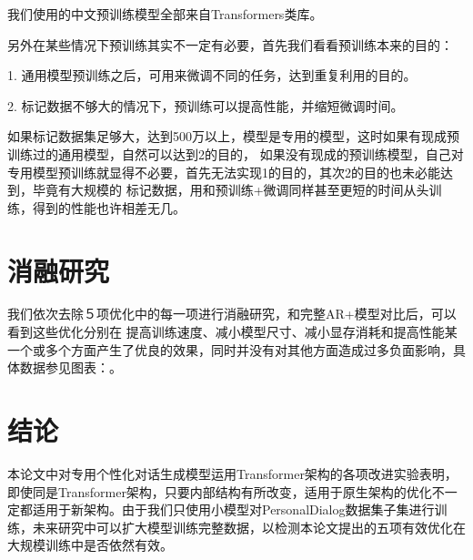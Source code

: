 \documentclass[letterpaper]{article} %
\DeclareRobustCommand{\citeext}[1]{\cite[#1]{#1}}
\begin{document}
\begin{CJK*}{UTF8}{gbsn}
我们使用的中文预训练模型全部来自Transformers类库\citeext{Wolf2019HuggingFacesTS}。

另外在某些情况下预训练其实不一定有必要，首先我们看看预训练本来的目的：

1. 通用模型预训练之后，可用来微调不同的任务，达到重复利用的目的。

2. 标记数据不够大的情况下，预训练可以提高性能，并缩短微调时间。

如果标记数据集足够大，达到500万以上，模型是专用的模型，这时如果有现成预训练过的通用模型，自然可以达到2的目的，
如果没有现成的预训练模型，自己对专用模型预训练就显得不必要，首先无法实现1的目的，其次2的目的也未必能达到，毕竟有大规模的
标记数据，用和预训练+微调同样甚至更短的时间从头训练，得到的性能也许相差无几。


\section[Ablation Study]{消融研究} 
我们依次去除５项优化中的每一项进行消融研究，和完整AR+模型对比后，可以看到这些优化分别在%
提高训练速度、减小模型尺寸、减小显存消耗和提高性能某一个或多个方面产生了优良的效果，同时并没有对其他方面造成过多负面影响，具体数据参见图表：。

\section[Conclusion]{结论} 
本论文中对专用个性化对话生成模型运用Transformer架构的各项改进实验表明，即使同是Transformer架构，只要内部结构有所改变，适用于原生架构的优化不一定都适用于新架构。由于我们只使用小模型对PersonalDialog数据集子集进行训练，未来研究中可以扩大模型训练完整数据，以检测本论文提出的五项有效优化在大规模训练中是否依然有效。




\clearpage\end{CJK*}
\end{document}

